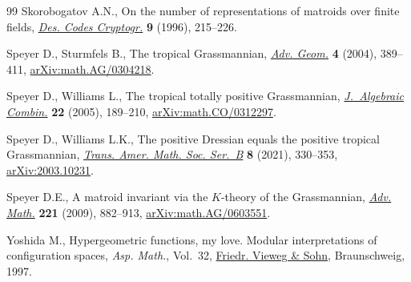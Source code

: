 \documentclass[pdftex]{sigma}
\theoremstyle{definition}
\numberwithin{equation}{section}
\begin{document}
\begin{thebibliography}{99}
Skorobogatov A.N., On the number of representations of matroids over finite
 fields, \href{https://doi.org/10.1007/BF00124595}{\textit{Des. Codes Cryptogr.}} \textbf{9} (1996), 215--226.

Speyer D., Sturmfels B., The tropical {G}rassmannian, \href{https://doi.org/10.1515/advg.2004.023}{\textit{Adv. Geom.}}
 \textbf{4} (2004), 389--411, \href{https://arxiv.org/abs/math.AG/0304218}{arXiv:math.AG/0304218}.

Speyer D., Williams L., The tropical totally positive {G}rassmannian,
 \href{https://doi.org/10.1007/s10801-005-2513-3}{\textit{J.~Algebraic Combin.}} \textbf{22} (2005), 189--210,
 \href{https://arxiv.org/abs/math.CO/0312297}{arXiv:math.CO/0312297}.

Speyer D., Williams L.K., The positive {D}ressian equals the positive tropical
 {G}rassmannian, \href{https://doi.org/10.1090/btran/67}{\textit{Trans. Amer. Math. Soc. Ser.~B}} \textbf{8} (2021),
 330--353, \href{https://arxiv.org/abs/2003.10231}{arXiv:2003.10231}.

Speyer D.E., A matroid invariant via the {$K$}-theory of the {G}rassmannian,
 \href{https://doi.org/10.1016/j.aim.2009.01.010}{\textit{Adv. Math.}} \textbf{221} (2009), 882--913, \href{https://arxiv.org/abs/math.AG/0603551}{arXiv:math.AG/0603551}.

Yoshida M., Hypergeometric functions, my love. {M}odular interpretations of
 configuration spaces, \textit{Asp. Math.}, Vol.~32, \href{https://doi.org/10.1007/978-3-322-90166-8}{Friedr. Vieweg \& Sohn},
 Braunschweig, 1997.

\end{thebibliography}\LastPageEnding
\end{document}
